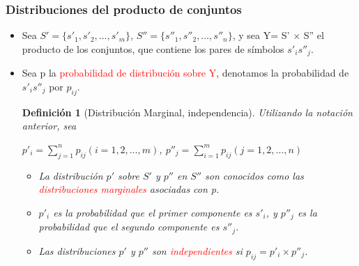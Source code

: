 \documentclass{beamer}
\theoremstyle{plain}
\newtheorem{definicion} [Definicion]{Definición}
\theoremstyle{example}
\theoremstyle{example}
\begin{document}
\begin{frame}  \frametitle{Distribuciones del producto de conjuntos} \footnotesize

\begin{itemize}

\item Sea $S' = \{s'_1 ,s'_2 ,\ldots ,s'_m \}$, $S'' = \{s''_1 ,s''_2 ,\ldots ,s''_n \}$, y sea Y= S' $\times$ S''  el producto de los conjuntos, que contiene los pares de símbolos $s'_i s''_j$. 

\item Sea p la \textcolor{red}{probabilidad de distribución sobre Y}, denotamos la probabilidad de $s'_i s''_j$ por $p_{ij}$.

\begin{definicion}[Distribución Marginal, independencia]
Utilizando la notación anterior, sea

\begin{center}$p'_i=\sum^{n}_{j=1} p_{ij} (i=1,2, \ldots , m)$, $p''_j=\sum^{m}_{i=1} p_{ij} (j=1,2, \ldots , n)$\end{center}

\begin{itemize}\footnotesize

\item La distribución $p'$ sobre $S'$ y $p''$ en $S''$ son conocidos como las \textcolor{red}{distribuciones marginales} asociadas con p. 

\item $p'_i$ es la probabilidad que el primer componente es $s'_i$, y  $p''_j$ es la probabilidad que el segundo componente es $s''_j$.  
\item Las distribuciones $p'$ y $p''$ son \textcolor{red}{independientes} si $p_{ij}=p'_i \times p''_j$.
\end{itemize}
\end{definicion}
\end{itemize}

\end{frame} 
\end{document}
